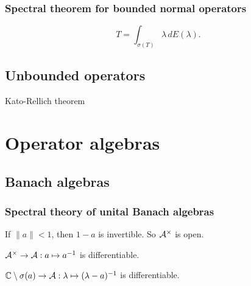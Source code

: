 \documentclass{../note}
\begin{document}
\section{Spectral theorem for bounded normal operators}
\[T=\int_{\sigma(T)}\lambda\,dE(\lambda).\]



\chapter{Unbounded operators}



Kato-Rellich theorem











\part{Operator algebras}
\chapter{Banach algebras}

\section{Spectral theory of unital Banach algebras}

\begin{prb}
\begin{parts}
\item If $\|a\|<1$, then $1-a$ is invertible. So $\mathcal{A}^\times$ is open.
\item $\mathcal{A}^\times\to\mathcal{A}:a\mapsto a^{-1}$ is differentiable.
\item $\mathbb{C}\setminus\sigma(a)\to\mathcal{A}:\lambda\mapsto(\lambda-a)^{-1}$ is differentiable.
\end{parts}
\end{prb}
\end{document}
